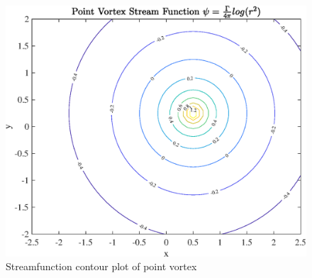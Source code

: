 



\justify
\begin{figure}[htbp]
\centering
\includegraphics[scale=0.65]{graphs/e1g1.eps}
\caption{Streamfunction contour plot of point vortex}
\label{e1g1}
\end{figure}